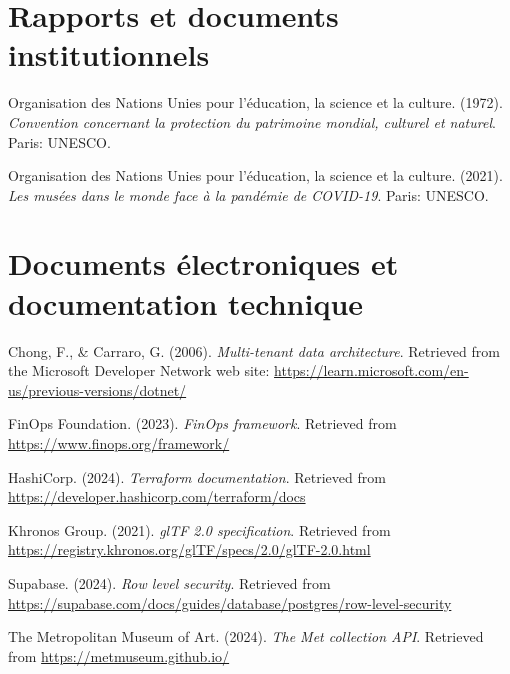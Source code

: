 \section*{Rapports et documents institutionnels}

\begin{apalist}
\item Organisation des Nations Unies pour l'éducation, la science et la culture.
      (1972). \emph{Convention concernant la protection du patrimoine mondial,
      culturel et naturel}. Paris: UNESCO.

\item Organisation des Nations Unies pour l'éducation, la science et la culture.
      (2021). \emph{Les musées dans le monde face à la pandémie de COVID-19}.
      Paris: UNESCO.
\end{apalist}

\section*{Documents électroniques et documentation technique}

\begin{apalist}
\item Chong, F., \& Carraro, G. (2006). \emph{Multi-tenant data architecture}.
      Retrieved from the Microsoft Developer Network web site:
      \url{https://learn.microsoft.com/en-us/previous-versions/dotnet/}

\item FinOps Foundation. (2023). \emph{FinOps framework}. Retrieved from
      \url{https://www.finops.org/framework/}

\item HashiCorp. (2024). \emph{Terraform documentation}. Retrieved from
      \url{https://developer.hashicorp.com/terraform/docs}

\item Khronos Group. (2021). \emph{glTF 2.0 specification}. Retrieved from
      \url{https://registry.khronos.org/glTF/specs/2.0/glTF-2.0.html}

\item Supabase. (2024). \emph{Row level security}. Retrieved from
      \url{https://supabase.com/docs/guides/database/postgres/row-level-security}

\item The Metropolitan Museum of Art. (2024). \emph{The Met collection API}.
      Retrieved from \url{https://metmuseum.github.io/}
\end{apalist}

